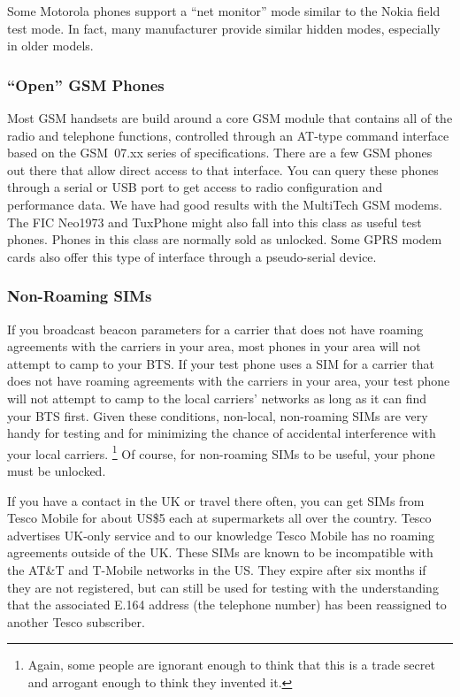 \documentclass[11pt]{book}
\begin{document}
Some Motorola phones support a ``net monitor'' mode similar to the Nokia field test mode.  In fact, many manufacturer provide similar hidden modes, especially in older models.

\subsubsection{``Open'' GSM Phones}
Most GSM handsets are build around a core GSM module that contains all of the radio and telephone functions, controlled through an AT-type command interface based on the GSM~07.xx series of specifications.
There are a few GSM phones out there that allow direct access to that interface. You can query these phones through a serial or USB port to get access to radio configuration and performance data.  We have had good results with the MultiTech GSM modems.  The FIC Neo1973 and TuxPhone might also fall into this class as useful test phones.  Phones in this class are normally sold as unlocked.
Some GPRS modem cards also offer this type of interface through a pseudo-serial device.

\subsubsection{Non-Roaming SIMs}
If you broadcast beacon parameters for a carrier that does not have roaming agreements with the carriers in your area, most phones in your area will not attempt to camp to your BTS.
If your test phone uses a SIM for a carrier that does not have roaming agreements with the carriers in your area, your test phone will not attempt to camp to the local carriers' networks as long as it can find your BTS first.
Given these conditions, non-local, non-roaming SIMs are very handy for testing and for minimizing the chance of accidental interference with your local carriers.%
\footnote{Again, some people are ignorant enough to think that this is a trade secret and arrogant enough to think they invented it.}
Of course, for non-roaming SIMs to be useful, your phone must be unlocked.

If you have a contact in the UK or travel there often, you can get SIMs from Tesco Mobile for about US\$5 each at supermarkets all over the country.
Tesco advertises UK-only service and to our knowledge Tesco Mobile has no roaming agreements outside of the UK.
These SIMs are known to be incompatible with the AT\&T and T-Mobile networks in the US.
They expire after six months if they are not registered, but can still be used for testing with the understanding that the associated E.164 address (the telephone number) has been reassigned to another Tesco subscriber.
\end{document}

